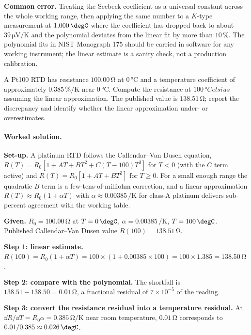 \textbf{Common error.} Treating the Seebeck coefficient as a
universal constant across the whole working range, then applying
the same number to a $K$-type measurement at $1{,}000 \,\degC$
where the coefficient has dropped back to about $39 \,\si{\micro
\volt\per\kelvin}$ and the polynomial deviates from the linear fit
by more than $10\,\%$. The polynomial fits in NIST Monograph 175
should be carried in software for any working instrument; the
linear estimate is a sanity check, not a production calibration.

\begin{exercise}
A Pt100 RTD has resistance $100.00 \,\si{\ohm}$ at
$0 \,\si{\degreeCelsius}$ and a temperature coefficient of
approximately $0.385\,\%/\si{\kelvin}$ near $0 \,\si
{\degreeCelsius}$. Compute the resistance at $100 \,\si{\degree
Celsius}$ assuming the linear approximation. The published value is
$138.51 \,\si{\ohm}$; report the discrepancy and identify whether
the linear approximation under- or overestimates.
\end{exercise}

\paragraph{Worked solution.}
\textbf{Set-up.} A platinum RTD follows the Callendar--Van Dusen
equation, $R(T) = R_{0}[1 + A T + B T^{2} + C(T - 100)T^{3}]$ for
$T < 0$ (with the $C$ term active) and $R(T) = R_{0}[1 + A T + B
T^{2}]$ for $T \geq 0$. For a small enough range the quadratic
$B$ term is a few-tens-of-milliohm correction, and a linear
approximation $R(T) \approx R_{0}(1 + \alpha T)$ with $\alpha
\approx 0.00385 \,\si{\per\kelvin}$ for class-A platinum delivers
sub-percent agreement with the working table.

\textbf{Given.} $R_{0} = 100.00 \,\si{\ohm}$ at $T = 0 \,\degC$,
$\alpha = 0.00385 \,\si{\per\kelvin}$, $T = 100 \,\degC$.
Published Callendar--Van Dusen value $R(100) = 138.51 \,\si{\ohm}$.

\textbf{Step 1: linear estimate.} $R(100) = R_{0}(1 + \alpha T) =
100 \times (1 + 0.00385 \times 100) = 100 \times 1.385 = 138.50
\,\si{\ohm}$.

\textbf{Step 2: compare with the polynomial.} The shortfall is
$138.51 - 138.50 = 0.01 \,\si{\ohm}$, a fractional residual of
$7 \times 10^{-5}$ of the reading.

\textbf{Step 3: convert the resistance residual into a
temperature residual.} At $\dd R/\dd T = R_{0} \alpha = 0.385 \,\si
{\ohm\per\kelvin}$ near room temperature, $0.01 \,\si{\ohm}$
corresponds to $0.01/0.385 \approx 0.026 \,\degC$.

